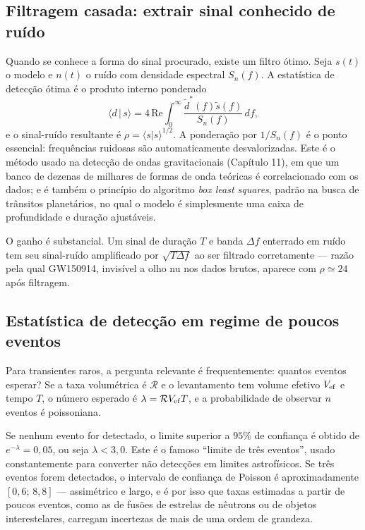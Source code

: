 \documentclass[11pt,a4paper]{article}
\begin{document}
\subsection*{Filtragem casada: extrair sinal conhecido de ruído}

Quando se conhece a forma do sinal procurado, existe um filtro ótimo. Seja $s(t)$ o modelo e $n(t)$ o ruído com densidade espectral $S_n(f)$. A estatística de detecção ótima é o produto interno ponderado
\[
\langle d\,|\,s\rangle=4\,\mathrm{Re}\int_0^{\infty}\frac{\tilde{d}^{*}(f)\tilde{s}(f)}{S_n(f)}\,df,
\]
e o sinal-ruído resultante é $\rho=\langle s|s\rangle^{1/2}$. A ponderação por $1/S_n(f)$ é o ponto essencial: frequências ruidosas são automaticamente desvalorizadas. Este é o método usado na detecção de ondas gravitacionais (Capítulo 11), em que um banco de dezenas de milhares de formas de onda teóricas é correlacionado com os dados; e é também o princípio do algoritmo \textit{box least squares}, padrão na busca de trânsitos planetários, no qual o modelo é simplesmente uma caixa de profundidade e duração ajustáveis.

O ganho é substancial. Um sinal de duração $T$ e banda $\Delta f$ enterrado em ruído tem seu sinal-ruído amplificado por $\sqrt{T\Delta f}$ ao ser filtrado corretamente --- razão pela qual GW150914, invisível a olho nu nos dados brutos, aparece com $\rho\simeq24$ após filtragem.

\subsection*{Estatística de detecção em regime de poucos eventos}

Para transientes raros, a pergunta relevante é frequentemente: quantos eventos esperar? Se a taxa volumétrica é $\mathcal{R}$ e o levantamento tem volume efetivo $V_{\rm ef}$ e tempo $T$, o número esperado é $\lambda=\mathcal{R}V_{\rm ef}T$, e a probabilidade de observar $n$ eventos é poissoniana.

Se nenhum evento for detectado, o limite superior a $95\%$ de confiança é obtido de $e^{-\lambda}=0{,}05$, ou seja $\lambda<3{,}0$. Este é o famoso ``limite de três eventos'', usado constantemente para converter não detecções em limites astrofísicos. Se três eventos forem detectados, o intervalo de confiança de Poisson é aproximadamente $[0{,}6;\,8{,}8]$ --- assimétrico e largo, e é por isso que taxas estimadas a partir de poucos eventos, como as de fusões de estrelas de nêutrons ou de objetos interestelares, carregam incertezas de mais de uma ordem de grandeza.
\end{document}
